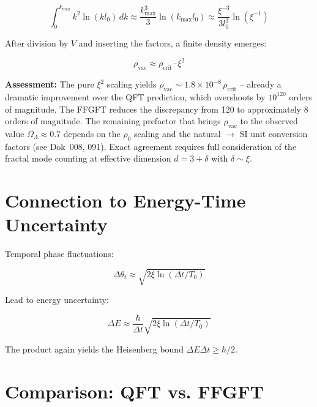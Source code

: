 	\begin{equation}
		\int_0^{k_{\max}} k^2 \ln(k l_0) \, dk \approx \frac{k_{\max}^3}{3} \ln(k_{\max} l_0) \approx \frac{\xi^{-3}}{3 l_0^3} \ln(\xi^{-1})
	\end{equation}
	
	After division by $V$ and inserting the factors, a finite density emerges:
	
	\begin{equation}
		\rho_{\text{vac}} \approx \rho_{\text{crit}} \cdot \xi^2
	\end{equation}
	
	\textbf{Assessment:} The pure $\xi^2$ scaling yields $\rho_{\text{vac}} \sim 1.8 \times 10^{-8}\,\rho_{\text{crit}}$ -- already a dramatic improvement over the QFT prediction, which overshoots by $10^{120}$ orders of magnitude. The FFGFT reduces the discrepancy from 120 to approximately 8 orders of magnitude. The remaining prefactor that brings $\rho_{\text{vac}}$ to the observed value $\Omega_\Lambda \approx 0.7$ depends on the $\rho_0$ scaling and the natural $\to$ SI unit conversion factors (see Dok~008, 091). Exact agreement requires full consideration of the fractal mode counting at effective dimension $d = 3 + \delta$ with $\delta \sim \xi$.
	
	\section*{Connection to Energy-Time Uncertainty}
	
	Temporal phase fluctuations:
	
	\begin{equation}
		\Delta \theta_t \approx \sqrt{2 \xi \ln(\Delta t / T_0)}
	\end{equation}
	
	Lead to energy uncertainty:
	
	\begin{equation}
		\Delta E \approx \frac{\hbar}{\Delta t} \sqrt{2 \xi \ln(\Delta t / T_0)}
	\end{equation}
	
	The product again yields the Heisenberg bound $\Delta E \Delta t \geq \hbar/2$.
	
	\section*{Comparison: QFT vs. FFGFT}
	
